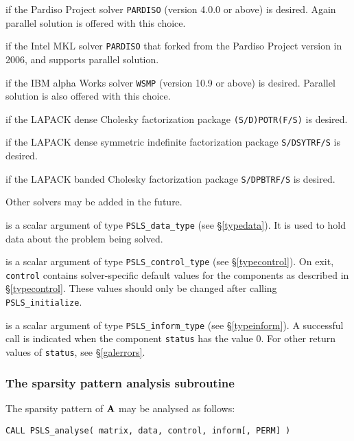 \documentclass{galahad}
\newcommand{\packagename}{PSLS}
\begin{document}
\begin{description}
\begin{description}
 if the Pardiso Project solver {\tt PARDISO} (version 4.0.0
or above) is desired. Again parallel solution is offered with this choice.

 if the Intel MKL solver {\tt PARDISO} that forked from the
Pardiso Project version in 2006, and supports parallel solution.

 if the IBM alpha Works solver {\tt WSMP} (version 10.9
or above) is desired. Parallel solution is also offered with this choice.

 if the LAPACK dense Cholesky factorization package
{\tt (S/D)POTR(F/S)} is desired.

 if the LAPACK dense symmetric indefinite factorization package
{\tt S/DSYTRF/S} is desired.

 if the LAPACK banded Cholesky factorization package
{\tt S/DPBTRF/S} is desired.

\end{description}
Other solvers may be added in the future.

 is a scalar \intentout argument of type
{\tt \packagename\_data\_type}
(see \S\ref{typedata}). It is used to hold data about the problem being
solved.

 is a scalar \intentout argument of type
{\tt \packagename\_control\_type}
(see \S\ref{typecontrol}).
On exit, {\tt control} contains solver-specific default values for the
components as described in \S\ref{typecontrol}.
These values should only be changed after calling
{\tt \packagename\_initialize}.

 is a scalar \intentout argument of type
{\tt \packagename\_inform\_type}
(see \S\ref{typeinform}).
A successful call is indicated when the  component {\tt status} has the value 0.
For other return values of {\tt status}, see \S\ref{galerrors}.

\end{description}


\subsubsection{The sparsity pattern analysis subroutine}
The sparsity pattern of ${\mathbf{A}}$ may be analysed as follows:

\hskip0.5in
{\tt CALL \packagename\_analyse( matrix, data, control, inform[, PERM] )}
\end{document}
